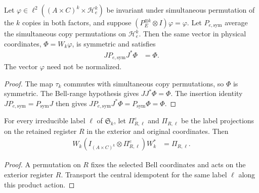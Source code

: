 \begin{theorem}
    \label{thm:schmidt_bell_witness_range}
    \leanok
    Let $\varphi\in\ell^2((A\times C)^k\times\mathcal H_e^k)$ be invariant
    under simultaneous permutation of the $k$ copies in both factors, and
    suppose $(P_E^{\otimes k}\otimes I)\varphi=\varphi$.
    Let $P_{e,\mathrm{sym}}$ average the simultaneous copy permutations
    on $\mathcal H_e^k$. Then the same vector in physical coordinates,
    $\Phi=W_k\varphi$, is symmetric and satisfies
    \begin{align*}
        JP_{e,\mathrm{sym}}J^*\Phi&=\Phi.
    \end{align*}
    The vector $\varphi$ need not be normalized.
\end{theorem}
\begin{proof}\leanok
    The map $\tau_k$ commutes with simultaneous copy permutations, so
    $\Phi$ is symmetric. The Bell-range hypothesis gives $JJ^*\Phi=\Phi$.
    The insertion identity $JP_{e,\mathrm{sym}}=P_{\mathrm{sym}}J$ then gives
    $JP_{e,\mathrm{sym}}J^*\Phi=P_{\mathrm{sym}}\Phi=\Phi$.
\end{proof}

\begin{theorem}
    \label{thm:schmidt_bell_witness_auxiliary_label}
    \leanok
    For every irreducible label $\ell$ of $\mathfrak S_k$, let
    $\Pi^e_{R,\ell}$ and $\Pi_{R,\ell}$ be the label projections on the
    retained register $R$ in the exterior and original coordinates.
    Then
    \begin{align*}
        W_k(I_{(A\times C)^k}\otimes\Pi^e_{R,\ell})W_k^*
        &=\Pi_{R,\ell}.
    \end{align*}
\end{theorem}
\begin{proof}\leanok
    A permutation on $R$ fixes the selected Bell coordinates and acts on
    the exterior register $R$. Transport the central idempotent for
    the same label $\ell$ along this product action.
\end{proof}

